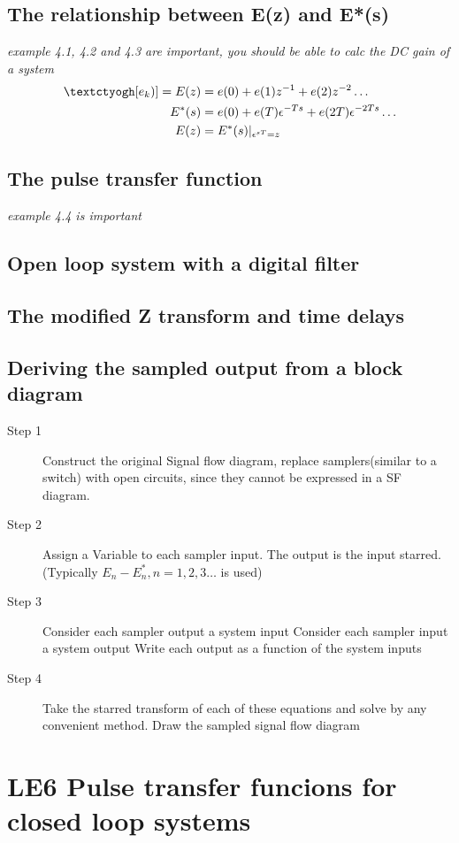\documentclass{report}
\begin{document}
	\section{The relationship between E(z) and E*(s)}
	\emph{example 4.1, 4.2 and 4.3 are important, you should be able to calc the DC gain of a system}
	\begin{align*}
	\text{\textctyogh}[e_k)] = E(z) &= e(0) + e(1)z^{-1} + e(2)z^{-2} \ldots\\
	 E^*(s) &= e(0) + e(T)\epsilon^{-Ts} + e(2T)\epsilon^{-2Ts} \ldots\\
	 E(z) &=  E^*(s) \lvert_{\epsilon^{sT} = z}
	\end{align*}
	\section{The pulse transfer function}
	\emph{example 4.4 is important}
	\section{Open loop system with a digital filter}
	\section{The modified Z transform and time delays}
	\section{Deriving the sampled output from a block diagram}
	\begin{description}
		\item[Step 1] Construct the original Signal flow diagram, replace samplers(similar to a switch) with open circuits, since they cannot be expressed in a SF diagram. 
		\item[Step 2] Assign a Variable to each sampler input. The output is the input starred.(Typically $E_n - E^*_n, n = 1,2,3 \ldots$ is used) 
		\item[Step 3] 
			\subitem Consider each sampler output a system input
			\subitem Consider each sampler input a system output
			\subitem Write each output as a function of the system inputs
		\item[Step 4] Take the starred transform of each of these equations and solve by any convenient method. Draw the sampled signal flow diagram
	\end{description}
\chapter{LE6 Pulse transfer funcions for closed loop systems}
\end{document}
